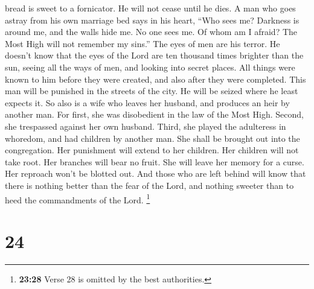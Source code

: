 bread is sweet to a fornicator. He will not cease until he dies.
 A man who goes astray from his own marriage bed says in
his heart, ``Who sees me? Darkness is around me, and the walls hide me.
No one sees me. Of whom am I afraid? The Most High will not remember my
sins.''  The eyes of men are his terror. He doesn't know
that the eyes of the Lord are ten thousand times brighter than the sun,
seeing all the ways of men, and looking into secret places.
 All things were known to him before they were created,
and also after they were completed.  This man will be
punished in the streets of the city. He will be seized where he least
expects it.  So also is a wife who leaves her husband,
and produces an heir by another man.  For first, she was
disobedient in the law of the Most High. Second, she trespassed against
her own husband. Third, she played the adulteress in whoredom, and had
children by another man.  She shall be brought out into
the congregation. Her punishment will extend to her children.
 Her children will not take root. Her branches will bear
no fruit.  She will leave her memory for a curse. Her
reproach won't be blotted out.  And those who are left
behind will know that there is nothing better than the fear of the Lord,
and nothing sweeter than to heed the commandments of the Lord.
 \footnote{\textbf{23:28} Verse 28 is omitted by the best
  authorities.}

\hypertarget{section-20}{%
\section{24}\label{section-20}}

